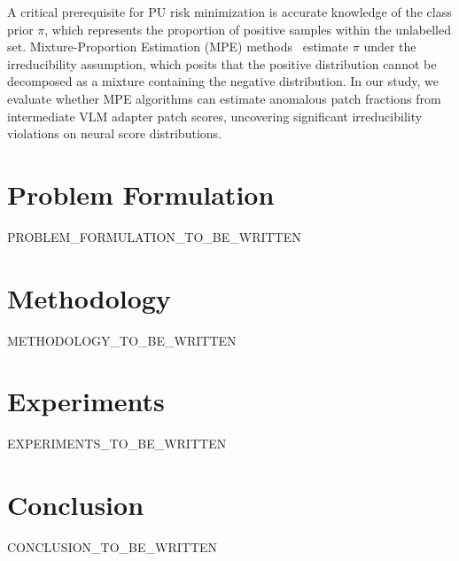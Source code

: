 \documentclass[10pt,twocolumn,letterpaper]{article}
\begin{document}
A critical prerequisite for PU risk minimization is accurate knowledge of the class prior $\pi$, which represents the proportion of positive samples within the unlabelled set. Mixture-Proportion Estimation (MPE) methods~\cite{ramaswamy2016mpe} estimate $\pi$ under the irreducibility assumption, which posits that the positive distribution cannot be decomposed as a mixture containing the negative distribution. In our study, we evaluate whether MPE algorithms can estimate anomalous patch fractions from intermediate VLM adapter patch scores, uncovering significant irreducibility violations on neural score distributions.

\section{Problem Formulation}
\label{sec:problem}
PROBLEM_FORMULATION_TO_BE_WRITTEN

\section{Methodology}
\label{sec:method}
METHODOLOGY_TO_BE_WRITTEN

\section{Experiments}
\label{sec:experiments}
EXPERIMENTS_TO_BE_WRITTEN

\section{Conclusion}
\label{sec:conclusion}
CONCLUSION_TO_BE_WRITTEN

\clearpage
{\small


}
\end{document}
